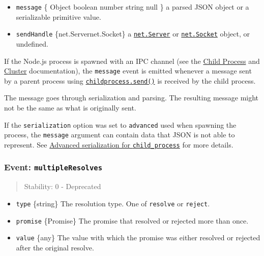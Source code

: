 \begin{itemize}
\tightlist
\item
  \texttt{message} \{ Object \textbar{} boolean \textbar{} number
  \textbar{} string \textbar{} null \} a parsed JSON object or a
  serializable primitive value.
\item
  \texttt{sendHandle} \{net.Server\textbar net.Socket\} a
  \href{net.md\#class-netserver}{\texttt{net.Server}} or
  \href{net.md\#class-netsocket}{\texttt{net.Socket}} object, or
  undefined.
\end{itemize}

If the Node.js process is spawned with an IPC channel (see the
\href{child_process.md}{Child Process} and \href{cluster.md}{Cluster}
documentation), the \texttt{\textquotesingle{}message\textquotesingle{}}
event is emitted whenever a message sent by a parent process using
\href{child_process.md\#subprocesssendmessage-sendhandle-options-callback}{\texttt{childprocess.send()}}
is received by the child process.

The message goes through serialization and parsing. The resulting
message might not be the same as what is originally sent.

If the \texttt{serialization} option was set to \texttt{advanced} used
when spawning the process, the \texttt{message} argument can contain
data that JSON is not able to represent. See
\href{child_process.md\#advanced-serialization}{Advanced serialization
for \texttt{child\_process}} for more details.

\subsubsection{\texorpdfstring{Event:
\texttt{\textquotesingle{}multipleResolves\textquotesingle{}}}{Event: \textquotesingle multipleResolves\textquotesingle{}}}\label{event-multipleresolves}

\begin{quote}
Stability: 0 - Deprecated
\end{quote}

\begin{itemize}
\tightlist
\item
  \texttt{type} \{string\} The resolution type. One of
  \texttt{\textquotesingle{}resolve\textquotesingle{}} or
  \texttt{\textquotesingle{}reject\textquotesingle{}}.
\item
  \texttt{promise} \{Promise\} The promise that resolved or rejected
  more than once.
\item
  \texttt{value} \{any\} The value with which the promise was either
  resolved or rejected after the original resolve.
\end{itemize}

